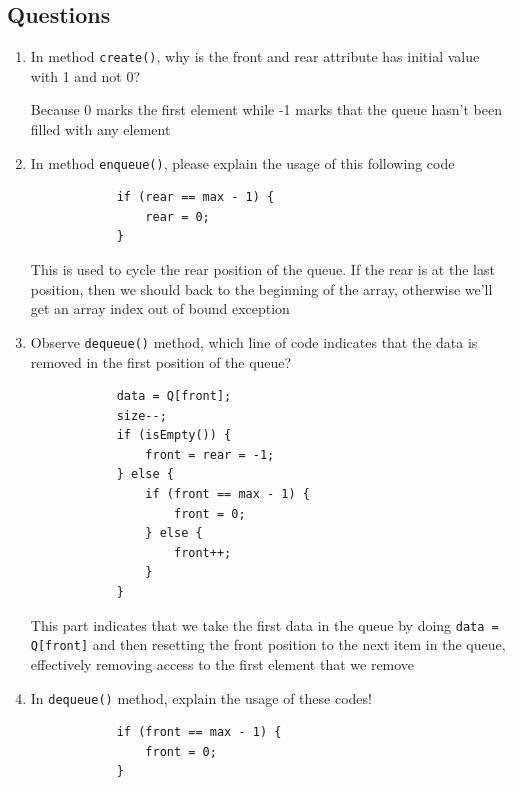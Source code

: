\documentclass[12pt,titlepage]{article}
\begin{document}
\subsection*{Questions}
\begin{enumerate}
    \item {
        In method \texttt{create()}, why is the front and rear attribute has initial value with 1 and not 0?

        Because 0 marks the first element while -1 marks that the queue hasn't been filled with any element
    }
    \item {
        In method \texttt{enqueue()}, please explain the usage of this following code

        \begin{verbatim}
            if (rear == max - 1) {
                rear = 0;
            }
        \end{verbatim}

        This is used to cycle the rear position of the queue. If the rear is at the last position,
        then we should back to the beginning of the array, otherwise we'll get an array index out of bound exception
    }
    \item {
        Observe \texttt{dequeue()} method, which line of code indicates that the data is removed in the first
        position of the queue?

        \begin{verbatim}
            data = Q[front];
            size--;
            if (isEmpty()) {
                front = rear = -1;
            } else {
                if (front == max - 1) {
                    front = 0;
                } else {
                    front++;
                }
            }
        \end{verbatim}

        This part indicates that we take the first data in the queue by doing \texttt{data = Q[front]}
        and then resetting the front position to the next item in the queue, effectively removing access to the first
        element that we remove
    }
    \item {
        In \texttt{dequeue()} method, explain the usage of these codes!
        
        \begin{verbatim}
            if (front == max - 1) {
                front = 0;
            }
        \end{verbatim}

}
\end{enumerate}
\end{document}

